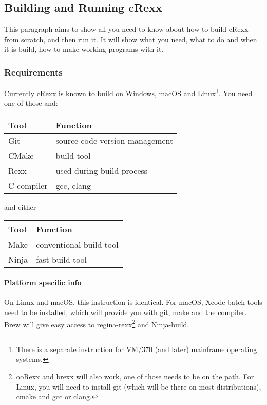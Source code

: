 \hypertarget{building-and-running-crexx}{%
\subsection{Building and Running
cRexx}\label{building-and-running-crexx}}

This paragraph aims to show all you need to know about how to build
cRexx from scratch, and then run it. It will show what you need, what to
do and when it is build, how to make working programs with it.

\hypertarget{requirements}{%
\subsubsection{Requirements}\label{requirements}}

Currently cRexx is known to build on Windows, macOS and
Linux\footnote{There is a separate instruction for VM/370 (and later)
  mainframe operating systems.}. You need one of those and:

\begin{longtable}[]{@{}ll@{}}
\toprule()
Tool & Function \\
\midrule()
\endhead
Git & source code version management \\
CMake & build tool \\
Rexx & used during build process \\
C compiler & gcc, clang \\
\bottomrule()
\end{longtable}

and either

\begin{longtable}[]{@{}ll@{}}
\toprule()
Tool & Function \\
\midrule()
\endhead
Make & conventional build tool \\
Ninja & fast build tool \\
\bottomrule()
\end{longtable}

\hypertarget{platform-specific-info}{%
\paragraph{Platform specific info}\label{platform-specific-info}}

On Linux and macOS, this instruction is identical. For macOS, Xcode
batch tools need to be installed, which will provide you with git, make
and the compiler. Brew will give easy access to regina-rexx\footnote{ooRexx
  and brexx will also work, one of those needs to be on the path. For
  Linux, you will need to install git (which will be there on most
  distributions), cmake and gcc or clang.} and Ninja-build.

